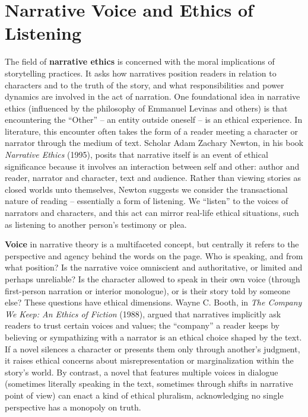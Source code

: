 \documentclass[12pt]{report}
\begin{document}
\section{Narrative Voice and Ethics of Listening}
The field of \textbf{narrative ethics} is concerned with the moral implications of storytelling practices. It asks how narratives position readers in relation to characters and to the truth of the story, and what responsibilities and power dynamics are involved in the act of narration. One foundational idea in narrative ethics (influenced by the philosophy of Emmanuel Levinas and others) is that encountering the “Other” – an entity outside oneself – is an ethical experience. In literature, this encounter often takes the form of a reader meeting a character or narrator through the medium of text. Scholar Adam Zachary Newton, in his book \textit{Narrative Ethics} (1995), posits that narrative itself is an event of ethical significance because it involves an interaction between self and other: author and reader, narrator and character, text and audience. Rather than viewing stories as closed worlds unto themselves, Newton suggests we consider the transactional nature of reading – essentially a form of listening. We “listen” to the voices of narrators and characters, and this act can mirror real-life ethical situations, such as listening to another person’s testimony or plea.

\textbf{Voice} in narrative theory is a multifaceted concept, but centrally it refers to the perspective and agency behind the words on the page. Who is speaking, and from what position? Is the narrative voice omniscient and authoritative, or limited and perhaps unreliable? Is the character allowed to speak in their own voice (through first-person narration or interior monologue), or is their story told by someone else? These questions have ethical dimensions. Wayne C. Booth, in \textit{The Company We Keep: An Ethics of Fiction} (1988), argued that narratives implicitly ask readers to trust certain voices and values; the “company” a reader keeps by believing or sympathizing with a narrator is an ethical choice shaped by the text. If a novel silences a character or presents them only through another’s judgment, it raises ethical concerns about misrepresentation or marginalization within the story’s world. By contrast, a novel that features multiple voices in dialogue (sometimes literally speaking in the text, sometimes through shifts in narrative point of view) can enact a kind of ethical pluralism, acknowledging no single perspective has a monopoly on truth.
\end{document}
